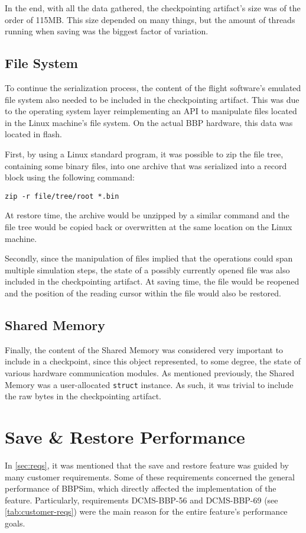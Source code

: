 {In the end, with all the data gathered, the checkpointing artifact's size was of the order of 115MB. This size depended on many things, but the amount of threads running when saving was the biggest factor of variation.

\subsection*{File System}
To continue the serialization process, the content of the flight software's emulated file system also needed to be included in the checkpointing artifact. This was due to the operating system layer reimplementing an API to manipulate files located in the Linux machine's file system. On the actual \gls{BBP} hardware, this data was located in flash.

First, by using a Linux standard program, it was possible to zip the file tree, containing some binary files, into one archive that was serialized into a record block using the following command:
\begin{verbatim}
zip -r file/tree/root *.bin
\end{verbatim}
At restore time, the archive would be unzipped by a similar command and the file tree would be copied back or overwritten at the same location on the Linux machine.

Secondly, since the manipulation of files implied that the operations could span multiple simulation steps, the state of a possibly currently opened file was also included in the checkpointing artifact. At saving time, the file would be reopened and the position of the reading cursor within the file would also be restored. 

\subsection*{Shared Memory}
Finally, the content of the Shared Memory was considered very important to include in a checkpoint, since this object represented, to some degree, the state of various hardware communication modules. As mentioned previously, the Shared Memory was a user-allocated \texttt{struct} instance. As such, it was trivial to include the raw bytes in the checkpointing artifact.  

\section{Save \& Restore Performance}
In \autoref{sec:reqs}, it was mentioned that the save and restore feature was guided by many customer requirements. Some of these requirements concerned the general performance of BBPSim, which directly affected the implementation of the feature. Particularly, requirements DCMS-BBP-56 and DCMS-BBP-69 (see \autoref{tab:customer-reqs}) were the main reason for the entire feature's performance goals.

}
